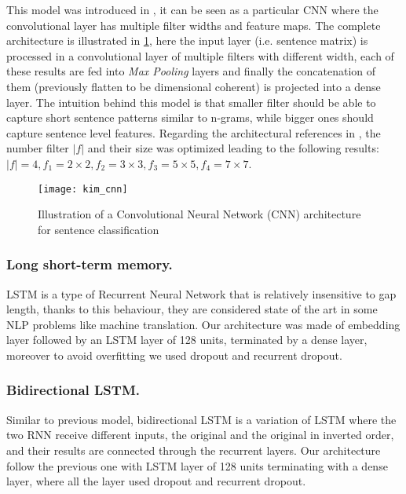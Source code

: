This model was introduced in \cite{kim2014convolutional}, it can be seen as a particular CNN where the convolutional layer has multiple filter widths and feature maps.
The complete architecture is illustrated in \cref{fig:kim}, here the input layer (i.e. sentence matrix) is processed in a convolutional layer of multiple filters with different width, each of these results are fed into \emph{Max Pooling} layers and finally the concatenation of them (previously flatten to be dimensional coherent) is projected into a dense layer.
The intuition behind this model is that smaller filter should be able to capture short sentence patterns similar to n-grams, while bigger ones should capture sentence level features.
Regarding the architectural references in \cite{kim2014convolutional}, the number filter $|f|$ and their size was optimized leading to the following results: $|f| = 4, f_1 = 2\times2, f_2 = 3\times3, f_3 = 5\times5, f_4 = 7\times7$.

\begin{figure}[h]
\footnotesize
\centering
\texttt{[image: kim\_cnn]}
\caption{\cite{zhang2015sensitivity} Illustration of a Convolutional Neural Network (CNN) architecture for sentence classification}
\label{fig:kim}
\end{figure}



\subsubsection{Long short-term memory.}
LSTM is a type of Recurrent Neural Network that is relatively insensitive to gap length, thanks to this behaviour, they are considered state of the art in some NLP problems like machine translation.
Our architecture was made of embedding layer followed by an LSTM layer of 128 units, terminated by a dense layer, moreover to avoid overfitting we used dropout and recurrent dropout.

\subsubsection{Bidirectional LSTM.} Similar to previous model, bidirectional LSTM is a variation of LSTM where the two RNN receive different inputs, the original and the original in inverted order, and their results are connected through the recurrent layers.
Our architecture follow the previous one with LSTM layer of 128 units terminating with a dense layer, where all the layer used dropout and recurrent dropout.

